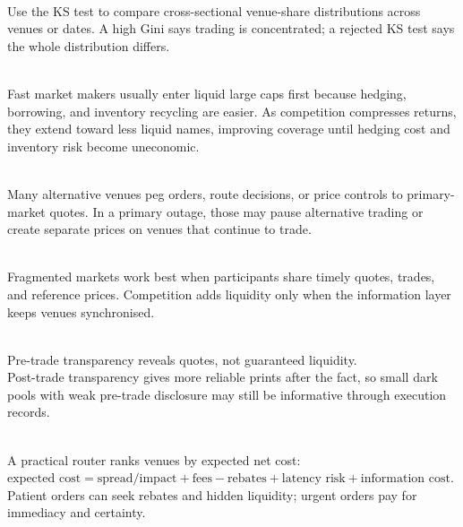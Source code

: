 \begin{practitionernote} \\
Use the KS test to compare cross-sectional venue-share distributions across venues or dates. A high Gini says trading is concentrated; a rejected KS test says the whole distribution differs.
\end{practitionernote}

\begin{mechanism} \\
Fast market makers usually enter liquid large caps first because hedging, borrowing, and inventory recycling are easier. As competition compresses returns, they extend toward less liquid names, improving coverage until hedging cost and inventory risk become uneconomic.
\end{mechanism}

\begin{caveat} \\
Many alternative venues peg orders, route decisions, or price controls to primary-market quotes. In a primary outage, those may pause alternative trading or create separate prices on venues that continue to trade.
\end{caveat}

\begin{principle} \\
Fragmented markets work best when participants share timely quotes, trades, and reference prices. Competition adds liquidity only when the information layer keeps venues synchronised.
\end{principle}

\begin{caveat} \\
Pre-trade transparency reveals quotes, not guaranteed liquidity.\\
Post-trade transparency gives more reliable prints after the fact, so small dark pools with weak pre-trade disclosure may still be informative through execution records.
\end{caveat}

\begin{practitionernote} \\
A practical router ranks venues by expected net cost:\\
$\text{expected cost}
= \text{spread/impact}+\text{fees}-\text{rebates}+\text{latency risk}+\text{information cost}$.\\
Patient orders can seek rebates and hidden liquidity; urgent orders pay for immediacy and certainty.
\end{practitionernote}

